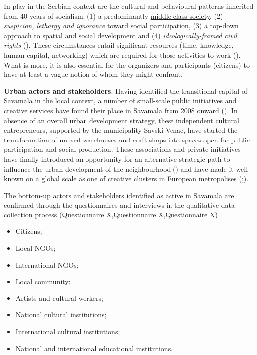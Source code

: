 \documentclass[11pt]{report}
\begin{document}
\begin{itemize}
In play in the Serbian context are the cultural and behavioural patterns inherited from 40 years of socialism: (1) a predominantly  \underline{middle class society},
(2) \textit{suspicion, lethargy and ignorance} toward social participation,
(3) a top-down approach to spatial and social development and
(4) \textit{ideologically-framed civil rights} (\href{Bolay}{\citealt{bolay_instrumental_2014}}).
These circumstances entail significant resources (time, knowledge, human capital, networking) which are required  for those activities to work (\href{ref}{\citealt{ministarstvo_prostora_urbani_2014}}).
What is more, it is also essential for the organizers and participants (citizens) to have at least a vague notion of whom they might confront.

\textbf{Urban actors and stakeholders}:
Having identified the transitional capital of Savamala in the local context, a number of small-scale public initiatives and creative services have found their place in Savamala from 2008 onward (\href{Cvetinovic}{\citealt{cvetinovic_engine_2013}}).
In absence of an overall urban development strategy, these independent cultural entrepreneurs, supported by the municipality Savski Venac, have started the  transformation  of unused warehouses and craft shops into spaces open for public participation and social production. These associations and private initiatives have finally introduced an opportunity for an alternative strategic path to influence the urban development of the neighbourhood (\href{Mikser}{\citealt{mikser_festival_mikser_2012}}) and have made it well known on a global scale as one of creative clusters in European metropolises  (\href{Monocle}{\citealt{monocle_are_2016}};\href{MikserHouse}{\citealt{mikser_house_guardian:_2016}}).

The bottom-up actors and stakeholders identified as active in Savamala are confirmed through the questionnaires and interviews in the qualitative data collection process (\href{Questionnaire Experts Post-socialist}{Questionnaire X},\href{Questionnaire Experts Savamala}{Questionnaire X},\href{Questionnaire Students Savamala}{Questionnaire X})

\begin{itemize}
\item Citizens;
\item Local NGOs;
\item International NGOs;
\item Local community;
\item Artists and cultural workers;
\item National cultural institutions;
\item International cultural institutions;
\item National and international educational institutions.
\end{itemize}


\end{itemize}
\end{document}
